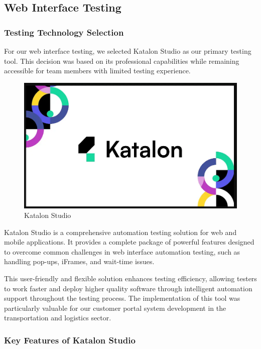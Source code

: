 \subsection{Web Interface Testing}
\subsubsection{Testing Technology Selection}
For our web interface testing, we selected Katalon Studio \cite{katalon_software_testing_intro} as our primary testing tool. This decision was based on its professional capabilities while remaining accessible for team members with limited testing experience.
\begin{figure}[H]
  \centering
  \includegraphics[width=15cm]{graphics/chapter6/katalon.png}
  \caption{Katalon Studio}
  \label{fig:katalon}
\end{figure}

Katalon Studio is a comprehensive automation testing solution for web and mobile applications. It provides a complete package of powerful features designed to overcome common challenges in web interface automation testing, such as handling pop-ups, iFrames, and wait-time issues.

This user-friendly and flexible solution enhances testing efficiency, allowing testers to work faster and deploy higher quality software through intelligent automation support throughout the testing process. The implementation of this tool was particularly valuable for our customer portal system development in the transportation and logistics sector.

\subsubsection{Key Features of Katalon Studio}

